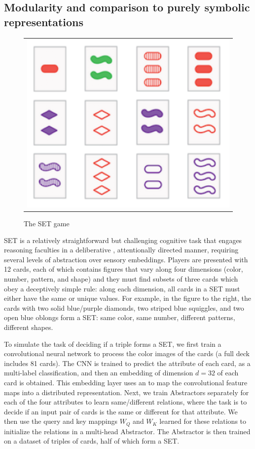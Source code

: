 \subsection{Modularity and comparison to purely symbolic representations}
\label{ssec:set_exp}


\begin{figure}
	\vskip-5pt
	\begin{tabular}{c}
		\includegraphics[width=.25\textwidth]{figures/set_example}\\[-5pt]
	\end{tabular}
	\caption{\footnotesize The SET game}
\end{figure}
SET is a relatively straightforward but challenging cognitive task that engages reasoning faculties in a deliberative
, attentionally directed manner, requiring several levels of abstraction over sensory embeddings. Players are
presented with 12 cards, each of which contains figures that vary along four dimensions (color, number, pattern, and
shape) and they must find subsets of three cards which obey a deceptively simple rule: along each dimension, all cards in a SET must either have the same or unique values.
For example, in the figure to the right, the cards with two solid blue/purple diamonds, two striped blue squiggles, and two open blue oblongs form a SET: same color, same number, different patterns, different shapes.

To simulate the task of deciding if a triple forms a SET, we first train a convolutional neural network to process the color images of the cards (a full deck includes 81 cards). The CNN is trained to predict the attribute of
each card, as a multi-label classification, and then an embedding of dimension $d=32$ of 
each card is obtained. This embedding layer uses an \MLP{} to map the convolutional feature maps into a distributed
representation. Next, we train Abstractors separately for each of the four attributes to learn same/different
relations, where the task is to decide if an input pair of cards is the same or different for that attribute. 
We then use the query and key mappings $W_Q$ and $W_K$ learned for these relations to initialize the relations
in a multi-head Abstractor. The Abstractor is then trained on a dataset of triples of cards, half of which form a SET. 

